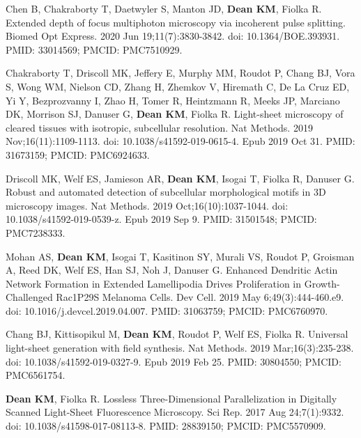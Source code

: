 \begin{etaremune}
\item Chen B, Chakraborty T, Daetwyler S, Manton JD, \textbf{Dean KM}, Fiolka R. Extended depth of focus multiphoton microscopy via incoherent pulse splitting. Biomed Opt Express. 2020 Jun 19;11(7):3830-3842. doi: 10.1364/BOE.393931. PMID: 33014569; PMCID: PMC7510929.

\item Chakraborty T, Driscoll MK, Jeffery E, Murphy MM, Roudot P, Chang BJ, Vora S, Wong WM, Nielson CD, Zhang H, Zhemkov V, Hiremath C, De La Cruz ED, Yi Y, Bezprozvanny I, Zhao H, Tomer R, Heintzmann R, Meeks JP, Marciano DK, Morrison SJ, Danuser G, \textbf{Dean KM}, Fiolka R. Light-sheet microscopy of cleared tissues with isotropic, subcellular resolution. Nat Methods. 2019 Nov;16(11):1109-1113. doi: 10.1038/s41592-019-0615-4. Epub 2019 Oct 31. PMID: 31673159; PMCID: PMC6924633.

\item Driscoll MK, Welf ES, Jamieson AR, \textbf{Dean KM}, Isogai T, Fiolka R, Danuser G. Robust and automated detection of subcellular morphological motifs in 3D microscopy images. Nat Methods. 2019 Oct;16(10):1037-1044. doi: 10.1038/s41592-019-0539-z. Epub 2019 Sep 9. PMID: 31501548; PMCID: PMC7238333.

\item Mohan AS, \textbf{Dean KM}, Isogai T, Kasitinon SY, Murali VS, Roudot P, Groisman A, Reed DK, Welf ES, Han SJ, Noh J, Danuser G. Enhanced Dendritic Actin Network Formation in Extended Lamellipodia Drives Proliferation in Growth-Challenged Rac1P29S Melanoma Cells. Dev Cell. 2019 May 6;49(3):444-460.e9. doi: 10.1016/j.devcel.2019.04.007. PMID: 31063759; PMCID: PMC6760970.

\item Chang BJ, Kittisopikul M, \textbf{Dean KM}, Roudot P, Welf ES, Fiolka R. Universal light-sheet generation with field synthesis. Nat Methods. 2019 Mar;16(3):235-238. doi: 10.1038/s41592-019-0327-9. Epub 2019 Feb 25. PMID: 30804550; PMCID: PMC6561754.

\item \textbf{Dean KM}, Fiolka R. Lossless Three-Dimensional Parallelization in Digitally Scanned Light-Sheet Fluorescence Microscopy. Sci Rep. 2017 Aug 24;7(1):9332. doi: 10.1038/s41598-017-08113-8. PMID: 28839150; PMCID: PMC5570909.


\end{etaremune}
